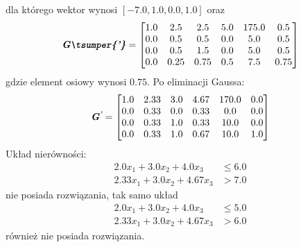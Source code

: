dla którego wektor  wynosi $[-7.0,1.0,0.0,1.0]$ oraz
\begin{equation*}
  \mf{G\tsumper{'}} =
  \begin{bmatrix}
    1.0 & 2.5 & 2.5 & 5.0 & 175.0 & 0.5 \\
    0.0 & 0.5 & 0.5 & 0.0 & 5.0 & 0.5 \\
    0.0 & 0.5 & 1.5 & 0.0 & 5.0 & 0.5 \\
    0.0 & 0.25 & 0.75 & 0.5 & 7.5 & 0.75
  \end{bmatrix}
\end{equation*}
gdzie element osiowy wynosi $0.75$. Po eliminacji Gaussa:
\begin{equation*}
  \textbf{\textit{G\textsuperscript{'}}} =
  \begin{bmatrix}
    1.0 & 2.33 & 3.0 & 4.67 & 170.0 & 0.0 \\
    0.0 & 0.33 & 0.0 & 0.33 & 0.0 & 0.0 \\
    0.0 & 0.33 & 1.0 & 0.33 & 10.0 & 0.0 \\
    0.0 & 0.33 & 1.0 & 0.67 & 10.0 & 1.0
  \end{bmatrix}
\end{equation*}
Układ nierówności:
\begin{equation*}
  \begin{aligned}
    2.0 x_{1}+ 3.0 x_{2}+ 4.0 x_{3} &\le 6.0 \\
    2.33 x_{1}+ 3.0 x_{2}+ 4.67 x_{3} &> 7.0
  \end{aligned}
\end{equation*}
nie posiada rozwiązania, tak samo układ
\begin{equation*}
  \begin{aligned}
    2.0 x_{1}+ 3.0 x_{2}+ 4.0 x_{3} &\le 5.0 \\
    2.33 x_{1}+ 3.0 x_{2}+ 4.67 x_{3} &> 6.0
  \end{aligned}
\end{equation*}
również nie posiada rozwiązania.

